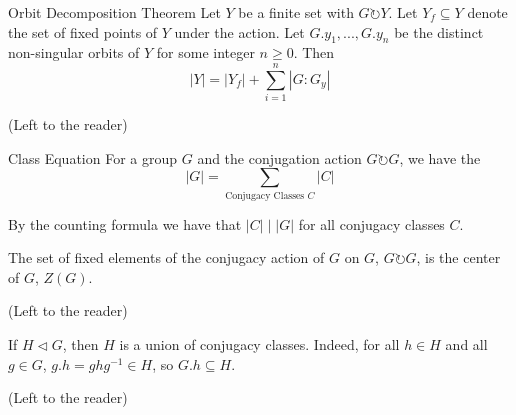 \documentclass[12pt, a4paper, twoside, openright, titlepage]{book}
\begin{document}
\begin{namthm}{Orbit Decomposition Theorem}{}
        Let $Y$ be a finite set with $G \circlearrowright Y$. Let $Y_f \subseteq Y$ denote the set of fixed points of $Y$ under the action. Let $G.y_1, ..., G.y_n$ be the distinct non-singular orbits of $Y$ for some integer $n \geq 0$. Then \begin{equation}
                |Y| = |Y_f| + \sum_{i=1}^n|G:G_y|
        \end{equation}
\end{namthm}
\begin{proof*}{}{}
        (Left to the reader)
\end{proof*}

\begin{cor}{Class Equation}{}
        For a group $G$ and the conjugation action $G \circlearrowright G$, we have the  \begin{equation}
                |G| = \sum\limits_{\text{Conjugacy Classes $C$}}|C|
        \end{equation}
\end{cor}

\begin{rmk}{}{}
        By the counting formula we have that $|C|\;\vert\;|G|$ for all conjugacy classes $C$.
\end{rmk}


\begin{prop}{}{}
        The set of fixed elements of the conjugacy action of $G$ on $G$, $G \circlearrowright G$, is the center of $G$, $Z(G)$.
\end{prop}
\begin{proof*}{}{}
        (Left to the reader)
\end{proof*}


\begin{prop}{}{}
        If $H \vartriangleleft G$, then $H$ is a union of conjugacy classes. Indeed, for all $h \in H$ and all $g \in G$, $g.h=ghg^{-1} \in H$, so $G.h \subseteq H$.
\end{prop}
\begin{proof*}{}{}
        (Left to the reader)
\end{proof*}
\end{document}
